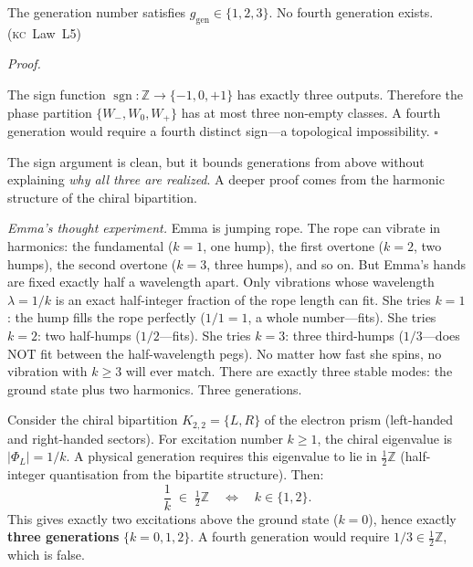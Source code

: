 \documentclass[11pt, a4paper, openany]{book}
\newcommand{\KC}[1]{\textnormal{(\textsc{kc}~#1)}}
\newcounter{thm}[chapter]
\renewenvironment{proof}[1][Proof]{%
  \par\noindent\textit{#1.}\quad
}{\hfill$\square$\par\medskip}
\begin{document}
\begin{theorem}\label{thm:gen-bound}
The generation number satisfies $g_{\mathrm{gen}} \in \{1, 2, 3\}$. No fourth generation exists. \KC{Law~L5}
\end{theorem}

\begin{proof}
The sign function $\operatorname{sgn} : \mathbb{Z} \to \{-1, 0, +1\}$ has exactly three outputs. Therefore the phase partition $\{W_-, W_0, W_+\}$ has at most three non-empty classes. A fourth generation would require a fourth distinct sign---a topological impossibility.
\end{proof}

\noindent
The sign argument is clean, but it bounds generations from above
without explaining \emph{why all three are realized}.  A deeper
proof comes from the harmonic structure of the chiral bipartition.

\smallskip\noindent
\textit{Emma's thought experiment.}
Emma is jumping rope.  The rope can vibrate in harmonics: the
fundamental ($k = 1$, one hump), the first overtone ($k = 2$, two
humps), the second overtone ($k = 3$, three humps), and so on.
But Emma's hands are fixed exactly half a wavelength apart.  Only
vibrations whose wavelength $\lambda = 1/k$ is an exact half-integer
fraction of the rope length can fit.  She tries $k = 1$: the hump
fills the rope perfectly ($1/1 = 1$, a whole number---fits).  She
tries $k = 2$: two half-humps ($1/2$---fits).  She tries $k = 3$:
three third-humps ($1/3$---does NOT fit between the half-wavelength
pegs).  No matter how fast she spins, no vibration with $k \geq 3$
will ever match.  There are exactly three stable modes: the ground
state plus two harmonics.  Three generations.
\smallskip

\begin{theorem}\label{thm:harmonic-gen}
Consider the chiral bipartition $K_{2,2} = \{L, R\}$ of the electron
prism (left-handed and right-handed sectors).  For excitation number
$k \geq 1$, the chiral eigenvalue is $|\Phi_L| = 1/k$.  A physical
generation requires this eigenvalue to lie in $\tfrac{1}{2}\mathbb{Z}$
(half-integer quantisation from the bipartite structure).  Then:
\[
  \frac{1}{k} \;\in\; \tfrac{1}{2}\mathbb{Z}
  \quad\Longleftrightarrow\quad
  k \in \{1, 2\}.
\]
This gives exactly two excitations above the ground state ($k = 0$),
hence exactly \textbf{three generations} $\{k = 0, 1, 2\}$.
A fourth generation would require $1/3 \in \tfrac{1}{2}\mathbb{Z}$,
which is false.
\end{theorem}
\end{document}

